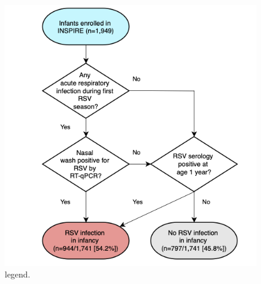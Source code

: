 \documentclass{article}
\begin{document}

%
%
%
%
%
%

\begin{figure}[ht] \hspace*{0cm} %
    \includegraphics[scale=0.2]{f1}
	\caption{legend.}
	\label{fig:1}
\end{figure}
\end{document}
